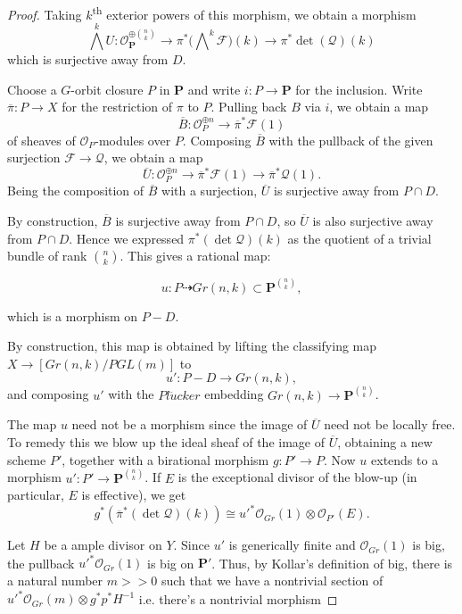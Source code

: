 \begin{proof}
Taking $k$\textsuperscript{th} exterior powers of this morphism, we obtain a
morphism
$$
  \bigwedge^k U : \mathcal{O}_{\mathbf{P}}^{\oplus \binom{n}{k}} \to
    \pi^*\big(\bigwedge\nolimits^k \mathcal{F}\big)(k) \to
    \pi^*\det(\mathcal{Q})(k)
$$
which is surjective away from $D$.

Choose a $G$-orbit closure $P$ in $\mathbf{P}$ and write $i : P \to \mathbf{P}$
for the inclusion.
Write $\overline{\pi} : P \to X$ for the restriction of $\pi$ to $P$.
Pulling back $B$ via $i$, we obtain a map
$$
  \overline{B} : \mathcal{O}_P^{\oplus n} \to \overline{\pi}^* \mathcal{F}(1)
$$
of sheaves of $\mathcal{O}_P$-modules over $P$.
Composing $\overline{B}$ with the pullback of the given surjection
$\mathcal{F} \to \mathcal{Q}$, we obtain a map
$$
  \overline{U} : \mathcal{O}_P^{\oplus n} \to
                  \overline{\pi}^*\mathcal{F}(1) \to
                  \overline{\pi}^*\mathcal{Q}(1).
$$
Being the composition of $\overline{B}$ with a surjection, $\overline{U}$ is
surjective away from $P \cap D$.

By construction, $\overline{B}$ is surjective away from $P\cap D$, so $\overline{U}$ is also surjective away from $P\cap D$. Hence we expressed $\pi^*(\det\mathcal{Q})(k)$ as the quotient of a trivial bundle of rank ${n\choose k}$. This gives a rational map:

$$u:P\dashrightarrow Gr(n,k)\subset \mathbf{P}^{{n\choose k}},$$

which is a morphism on $P-D$.

By construction, this map is obtained by lifting the classifying map $X\to [Gr(n,k)/PGL(m)]$ to 
$$u':P-D\to Gr(n,k),$$
and composing $u'$ with the $Pl\ddot{u}cker$ embedding $Gr(n,k)\to \mathbf{P}^{{n\choose k}}$.

The map $u$ need not be a morphism since the image of $\overline{U}$ need not be locally free. 
To remedy this we blow up the ideal sheaf of the image of $\overline{U}$, obtaining a new scheme $P'$, together with a birational morphism $g:P'\to P$. 
Now $u$ extends to a morphism $u':P'\to \mathbf{P}^{{n\choose k}}$. If $E$ is the exceptional divisor of the blow-up (in particular, $E$ is effective), we get
$$g^*(\overline{\pi}^*(\det\mathcal{Q})(k))\cong u'^*\mathcal{O}_{Gr}(1)\otimes\mathcal{O}_{P'}(E).$$

Let $H$ be a ample divisor on $Y$. Since $u'$ is generically finite and $\mathcal{O}_{Gr}(1)$ is big, the pullback $u'^*  \mathcal{O}_{Gr}(1)$ is big on $\mathbf{P}'$.  Thus, by Kollar's definition of big, there is a natural number $m>>0$ such that we have a nontrivial section of $u'^*\mathcal{O}_{Gr}(m)\otimes g^*p^*H^{-1}$ i.e. there's a nontrivial morphism 


\end{proof}
